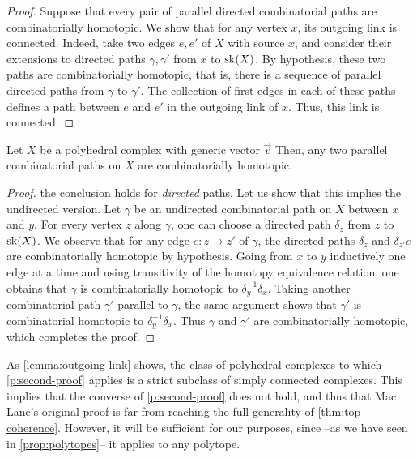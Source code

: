 \begin{proof}
    Suppose that every pair of parallel directed combinatorial paths are combinatorially homotopic. 
    We show that for any vertex $x$, its outgoing link is  connected. 
    Indeed, take two edges $e,e'$ of $X$ with source $x$, and consider their extensions to directed paths $\gamma, \gamma'$ from $x$ to $\mathrm{sk}(X)$. 
    By hypothesis, these two paths are combinatorially homotopic, that is, there is a sequence of parallel directed paths from $\gamma$ to $\gamma'$. 
    The collection of first edges in each of these paths defines a  path between $e$ and $e'$ in the outgoing link of $x$. 
    Thus, this link is  connected. 
\end{proof}


\begin{thm}
\label{p:second-proof}
    Let $X$ be a polyhedral complex with generic vector $\vec v$ 
    Then, any two parallel combinatorial paths on $X$ are combinatorially homotopic.
\end{thm}

\begin{proof} 
     the conclusion holds for \emph{directed} paths.  
    Let us show that this implies the undirected version.
    Let $\gamma$ be an undirected combinatorial path on $X$ between $x$ and $y$.
    For every vertex $z$ along $\gamma$, one can choose a directed path $\delta_z$ from $z$ to $\mathrm{sk}(X)$. 
    We observe that for any edge $e: z \to z'$ of $\gamma$, the directed paths $\delta_z$ and $\delta_{z'}e$ are combinatorially homotopic by hypothesis. 
    Going from $x$ to $y$ inductively one edge at a time and using transitivity of the homotopy equivalence relation, one obtains that $\gamma$ is combinatorially homotopic to $\delta_y^{-1}\delta_x$. 
    Taking another combinatorial path $\gamma'$ parallel to $\gamma$, the same argument shows that $\gamma'$ is combinatorial homotopic to $\delta_y^{-1}\delta_x$.
    Thus $\gamma$ and $\gamma'$ are combinatorially homotopic, which completes the proof. 
\end{proof}

As \cref{lemma:outgoing-link} shows, the class of polyhedral complexes to which \cref{p:second-proof} applies is a strict subclass of simply connected complexes.
This implies that the converse of \cref{p:second-proof} does not hold, and thus that Mac Lane's original proof is far from reaching the full generality of \cref{thm:top-coherence}.
However, it will be sufficient for our purposes, since --as we have seen in \cref{prop:polytopes}-- it applies to any polytope.

